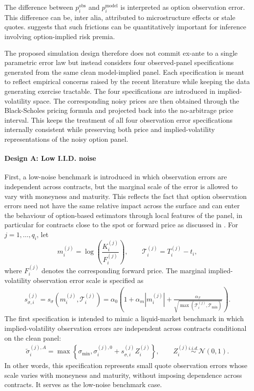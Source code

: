 \documentclass[11pt,a4paper,notitlepage]{article}
\numberwithin{equation}{section}
\begin{document}
The difference between $p_i^{\mathrm{obs}}$ and $p_i^{\mathrm{model}}$ is interpreted as option observation error.
This difference can be, inter alia, attributed to microstructure effects or stale quotes. \citet{duarte2024very}
suggests that such frictions can be quantitatively important for inference involving option-implied risk premia. 

The proposed simulation design therefore does not commit ex-ante to a single parametric error law but instead considers four observed-panel specifications generated from the same clean model-implied panel. Each specification is meant to reflect empirical concerns raised by the recent literature while keeping the data generating exercise tractable. The four specifications are introduced in implied-volatility space. The corresponding noisy prices are then obtained through the Black-Scholes pricing formula and projected back into the no-arbitrage price interval. This keeps the treatment of all four observation error specifications internally consistent while preserving both price and implied-volatility representations of the noisy option panel.

\paragraph{Design A: Low I.I.D. noise}
First, a low-noise benchmark is introduced in which observation errors are independent across contracts, but the marginal scale of the error is allowed to vary with moneyness and maturity. This reflects the fact that option observation errors need not have the same relative impact across the surface and can enter the behaviour of option-based estimators through local features of the panel, in particular for contracts close to the spot or forward price as discussed in \cite{chongtodorov2024vov}.
For $j=1,\ldots,q_i$, let
\[
m_i^{(j)}=\log\left(\frac{K_i^{(j)}}{F_i^{(j)}}\right),
\qquad
\mathcal T_i^{(j)}=T_i^{(j)}-t_i,
\]
where $F_i^{(j)}$ denotes the corresponding forward price. The marginal implied-volatility observation error scale is specified as
\begin{align}
s_{\sigma,i}^{(j)}
=
s_\sigma(m_i^{(j)},\mathcal T_i^{(j)})
=
\alpha_0\left(
1+\alpha_m |m_i^{(j)}|
+\frac{\alpha_{\mathcal T}}{\sqrt{\max(\mathcal T_i^{(j)},\mathcal T_{\min})}}
\right).
\label{eq:iv_error_scale}
\end{align}
The first specification is intended to mimic a liquid-market benchmark in which implied-volatility observation errors are independent across contracts conditional on the clean panel:
\begin{align}
\tilde\sigma_i^{(j),A}
=
\max\left\{
\sigma_{\min},
\sigma_i^{(j),0}
+
s_{\sigma,i}^{(j)}Z_i^{(j)}
\right\},
\qquad
Z_i^{(j)}\overset{i.i.d.}{\sim}\mathcal{N}(0,1).
\label{eq:noise_liquid}
\end{align}
In other words, this specification represents small quote observation errors whose scale varies with moneyness and maturity, without imposing dependence across contracts. It serves as the low-noise benchmark case.
\end{document}
